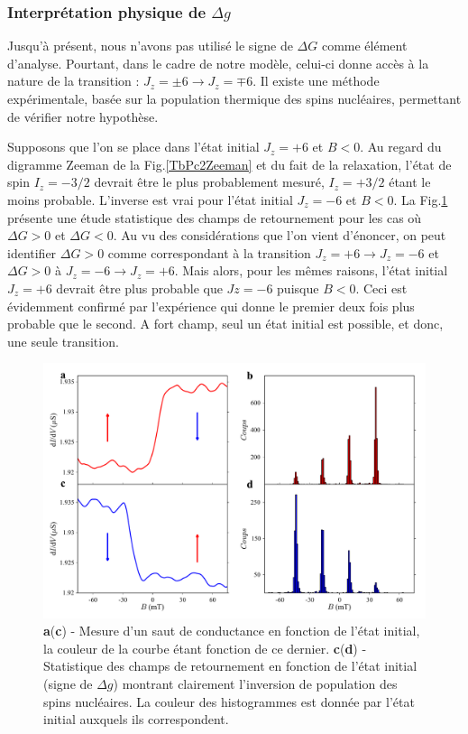 \subsubsection{Interprétation physique de $\Delta g$}
Jusqu'à présent, nous n'avons pas utilisé le signe de $\Delta G$ comme élément d'analyse. Pourtant, dans le cadre de notre modèle, celui-ci donne accès à la nature de la transition : $J_z = \pm6 \rightarrow J_z = \mp 6$. Il existe une méthode expérimentale, basée sur la population thermique des spins nucléaires, permettant de vérifier notre hypothèse.

Supposons que l'on se place dans l'état initial $J_z=+6$ et $B<0$. Au regard du digramme Zeeman de la Fig.\ref{TbPc2Zeeman} et du fait de la relaxation, l'état de spin $I_z = -3/2$ devrait être le plus probablement mesuré, $I_z = +3/2$ étant le moins probable. L'inverse est vrai pour l'état initial $J_z=-6$ et $B<0$. La Fig.\ref{analyse_signe_saut} présente une étude statistique des champs de retournement pour les cas où $\Delta G> 0$ et $\Delta G< 0$. Au vu des considérations que l'on vient d'énoncer, on peut identifier $\Delta G> 0$ comme correspondant à la transition $J_z = +6 \rightarrow J_z =  - 6$ et $\Delta G> 0$ à $J_z = -6 \rightarrow J_z =  + 6$. Mais alors, pour les mêmes raisons, l'état initial $J_z=+6$ devrait être plus probable que $Jz=-6$ puisque $B<0$. Ceci est évidemment confirmé par l'expérience qui donne le premier deux fois plus probable que le second. A fort champ, seul un état initial est possible, et donc, une seule transition. 

\begin{figure}
\includegraphics[scale=0.45]{Resultats/JumpSens/JumpSens.pdf} 
\caption{\textbf{a}(\textbf{c}) - Mesure d'un saut de conductance en fonction de l'état initial, la couleur de la courbe étant fonction de ce dernier. \textbf{c}(\textbf{d}) - Statistique des champs de retournement en fonction de l'état initial (signe de $\Delta g$) montrant clairement l'inversion de population des spins nucléaires. La couleur des histogrammes est donnée par l'état initial auxquels ils correspondent.}
\label{analyse_signe_saut}
\end{figure}

